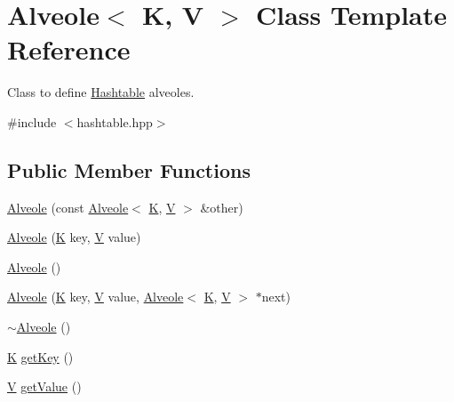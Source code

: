 \hypertarget{class_alveole}{\section{Alveole$<$ K, V $>$ Class Template Reference}
\label{class_alveole}
}


Class to define \hyperlink{class_hashtable}{Hashtable} alveoles.  




{\ttfamily \#include $<$hashtable.\-hpp$>$}

\subsection*{Public Member Functions}
\begin{DoxyCompactItemize}
\item 
\hyperlink{class_alveole_a66a49658c41430d186827c8926f64900}{Alveole} (const \hyperlink{class_alveole}{Alveole}$<$ \hyperlink{sample__hashtable_8cpp_a97d832ae23af4f215e801e37e4f94254}{K}, \hyperlink{sample__hashtable_8cpp_af40a326b23c68a27cebe60f16634a2cb}{V} $>$ \&other)
\item 
\hyperlink{class_alveole_a24ac02d39a6eca02630f6f2a11d86575}{Alveole} (\hyperlink{sample__hashtable_8cpp_a97d832ae23af4f215e801e37e4f94254}{K} key, \hyperlink{sample__hashtable_8cpp_af40a326b23c68a27cebe60f16634a2cb}{V} value)
\item 
\hyperlink{class_alveole_aa935efb574de27fcf5171e1a631f40c9}{Alveole} ()
\item 
\hyperlink{class_alveole_afc611d6ccd9406b36c1326653cc80f1e}{Alveole} (\hyperlink{sample__hashtable_8cpp_a97d832ae23af4f215e801e37e4f94254}{K} key, \hyperlink{sample__hashtable_8cpp_af40a326b23c68a27cebe60f16634a2cb}{V} value, \hyperlink{class_alveole}{Alveole}$<$ \hyperlink{sample__hashtable_8cpp_a97d832ae23af4f215e801e37e4f94254}{K}, \hyperlink{sample__hashtable_8cpp_af40a326b23c68a27cebe60f16634a2cb}{V} $>$ $\ast$next)
\item 
\hyperlink{class_alveole_ac5b90a69dc1458b981a742e80499aca0}{$\sim$\-Alveole} ()
\item 
\hyperlink{sample__hashtable_8cpp_a97d832ae23af4f215e801e37e4f94254}{K} \hyperlink{class_alveole_add57358f630300978cfd314a9a392c8b}{get\-Key} ()
\item 
\hyperlink{sample__hashtable_8cpp_af40a326b23c68a27cebe60f16634a2cb}{V} \hyperlink{class_alveole_a63378af984be5bb63fb755010c61002f}{get\-Value} ()
\item 

\end{DoxyCompactItemize}
